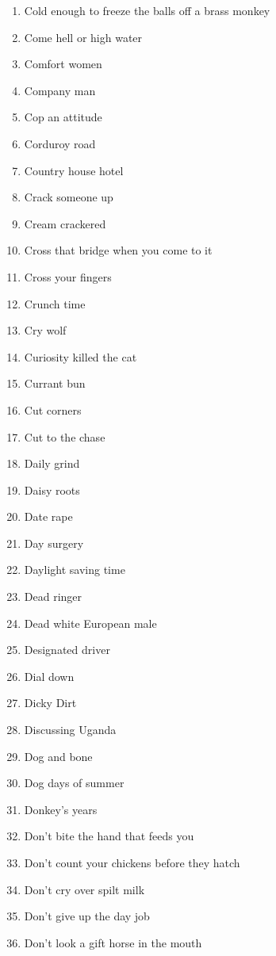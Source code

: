 \begin{enumerate}
        \item  Cold enough to freeze the balls off a brass monkey
        \item  Come hell or high water
        \item  Comfort women
        \item  Company man
        \item  Cop an attitude
        \item  Corduroy road
        \item  Country house hotel
        \item  Crack someone up
        \item  Cream crackered
        \item  Cross that bridge when you come to it
        \item  Cross your fingers
        \item  Crunch time
        \item  Cry wolf
        \item  Curiosity killed the cat
        \item  Currant bun
        \item  Cut corners
        \item  Cut to the chase
        \item  Daily grind
        \item  Daisy roots
        \item  Date rape
        \item  Day surgery
        \item  Daylight saving time
        \item  Dead ringer
        \item  Dead white European male
        \item  Designated driver
        \item  Dial down
        \item  Dicky Dirt
        \item  Discussing Uganda
        \item  Dog and bone
        \item  Dog days of summer
        \item  Donkey's years
        \item  Don't bite the hand that feeds you
        \item  Don't count your chickens before they hatch
        \item  Don't cry over spilt milk
        \item  Don't give up the day job
        \item  Don't look a gift horse in the mouth

\end{enumerate}
